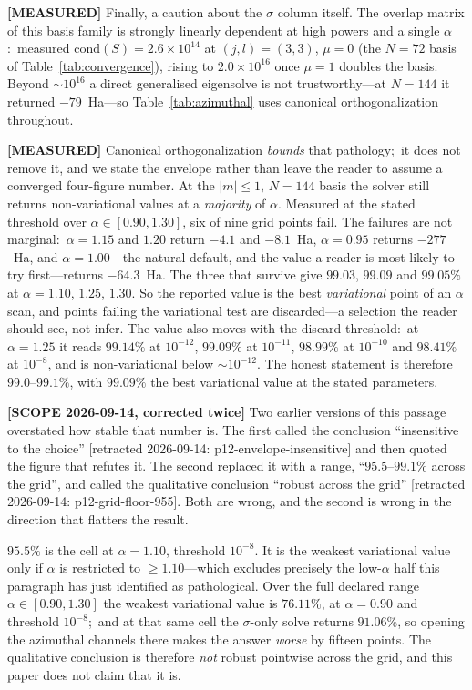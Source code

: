 \documentclass[aps,pra,twocolumn,superscriptaddress,longbibliography]{revtex4-2}
\newcommand{\gvq}[2]{#2}
\begin{document}
\textbf{[MEASURED]} Finally, a caution about the $\sigma$ column
itself.  The overlap matrix of this basis family is strongly
linearly dependent at high powers and a single $\alpha$:\ measured
$\mathrm{cond}(S) = 2.6\times10^{14}$ at $(j,l) = (3,3)$, $\mu = 0$
(the $N = 72$ basis of Table~\ref{tab:convergence}), rising to
$2.0\times10^{16}$ once $\mu = 1$ doubles the basis.  Beyond
$\sim\!10^{16}$ a direct generalised eigensolve is not
trustworthy---at $N = 144$ it returned $-79$~Ha---so
Table~\ref{tab:azimuthal} uses canonical orthogonalization
throughout.

\textbf{[MEASURED]} Canonical orthogonalization \emph{bounds} that
pathology;\ it does not remove it, and we state the envelope rather
than leave the reader to assume a converged four-figure number.  At
the $|m| \le 1$, $N = 144$ basis the solver still returns
non-variational values at a \emph{majority} of $\alpha$.  Measured at
the stated threshold over $\alpha \in [0.90, 1.30]$, six of nine grid
points fail.  The failures are not marginal:\ $\alpha = 1.15$ and $1.20$
return $-4.1$ and $-8.1$~Ha, $\alpha = 0.95$ returns $-277$~Ha, and
$\alpha = 1.00$---the natural default, and the value a reader is most
likely to try first---returns $-64.3$~Ha.  The three that survive give $99.03$, $99.09$ and $99.05\%$ at
$\alpha = 1.10$, $1.25$, $1.30$.  So the reported value is the best
\emph{variational} point of an $\alpha$ scan, and points failing the
variational test are discarded---a selection the reader should see, not
infer.  The value also moves with the discard threshold:\ at
$\alpha = 1.25$ it reads $99.14\%$ at $10^{-12}$, $99.09\%$ at
$10^{-11}$, $98.99\%$ at $10^{-10}$ and $98.41\%$ at $10^{-8}$,
and is non-variational below $\sim\!10^{-12}$.  The honest
statement is therefore $99.0$--$99.1\%$, with
$\gvq{p12_azimuthal_de_pct}{99.09}\%$ the best
variational value at the stated parameters.

\textbf{[SCOPE 2026-09-14, corrected twice]}
Two earlier versions of this passage overstated how stable that number is.
The first called the conclusion ``insensitive to the choice''
[retracted 2026-09-14: p12-envelope-insensitive] and then quoted the figure
that refutes it.  The second replaced it with a range, ``$95.5$--$99.1\%$
across the grid'', and called the qualitative conclusion ``robust across the
grid'' [retracted 2026-09-14: p12-grid-floor-955].  Both are wrong, and the
second is wrong in the direction that flatters the result.

$95.5\%$ is the cell at $\alpha = 1.10$, threshold $10^{-8}$.  It is the
weakest variational value only if $\alpha$ is restricted to $\ge 1.10$---which
excludes precisely the low-$\alpha$ half this paragraph has just identified as
pathological.  Over the full declared range $\alpha \in [0.90, 1.30]$ the
weakest variational value is $76.11\%$, at $\alpha = 0.90$ and threshold
$10^{-8}$;\ and at that same cell the $\sigma$-only solve returns $91.06\%$,
so opening the azimuthal channels there makes the answer \emph{worse} by
fifteen points.  The qualitative conclusion is therefore \emph{not} robust
pointwise across the grid, and this paper does not claim that it is.
\end{document}
